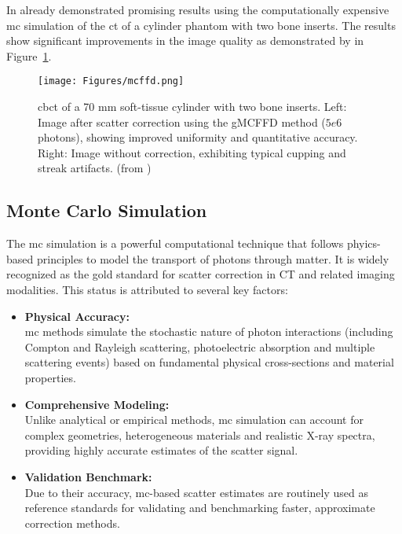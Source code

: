 In \citeyear{mcffd2011} \citeauthor{mcffd2011} \cite{mcffd2011} already
demonstrated promising results using the computationally expensive \ac{mc}
simulation of the \ac{ct} of a cylinder phantom with two bone inserts. The
results show significant improvements in the image quality as demonstrated by
\citeauthor{mcffd2011} in Figure~\ref{fig:scatter_correction_comparison}.

\captionsetup{justification=justified,singlelinecheck=false}
\begin{figure}[H]
    \centering
    \texttt{[image: Figures/mcffd.png]}
    \caption{\ac{cbct} of a 70 mm soft-tissue cylinder with two bone inserts.
    Left: Image after scatter correction using the gMCFFD method ($5e6$
    photons), showing improved uniformity and quantitative accuracy. Right:
    Image without correction, exhibiting typical cupping and streak artifacts.
    (from \cite{mcffd2011})}
    \label{fig:scatter_correction_comparison}
\end{figure}

\subsection{Monte Carlo Simulation}

The \ac{mc} simulation is a powerful computational technique that follows
phyics-based principles to model the transport of photons through matter. It is
widely recognized as the gold standard for scatter correction in CT and related
imaging modalities. This status is attributed to several key factors:

\begin{itemize}
    \item \textbf{Physical Accuracy:} \\
    \ac{mc} methods simulate the stochastic nature of photon interactions
    (including Compton and Rayleigh scattering, photoelectric absorption and
    multiple scattering events) based on fundamental physical cross-sections and
    material properties.

    \item \textbf{Comprehensive Modeling:} \\
    Unlike analytical or empirical methods, \ac{mc} simulation can account for
    complex geometries, heterogeneous materials and realistic X-ray spectra,
    providing highly accurate estimates of the scatter signal.

    \item \textbf{Validation Benchmark:} \\
    Due to their accuracy, \ac{mc}-based scatter estimates are routinely used as
    reference standards for validating and benchmarking faster, approximate
    correction methods.
\end{itemize}


